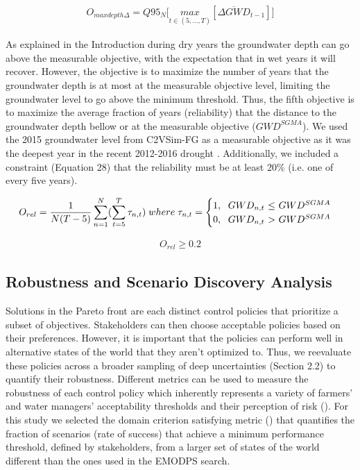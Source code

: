 \documentclass[a4paper,fleqn]{cas-sc}
\begin{document}
\begin{align}
O_{maxdepth\Delta} = Q95_{N} \bigg[\underset{t\in(5,...,T)}{max}[\overline{\Delta GWD}_{t-1}]\bigg]
\end{align}

As explained in the Introduction during dry years the groundwater depth can go above the measurable objective, with the expectation that in wet years it will recover. However, the objective is to maximize the number of years that the groundwater depth is at most at the measurable objective level, limiting the groundwater level to go above the minimum threshold. Thus, the fifth objective is to maximize the average fraction of years (reliability) that the distance to the groundwater depth bellow or at the measurable objective ($GWD^{SGMA}$). We used the 2015 groundwater level from C2VSim-FG as a measurable objective as it was the deepest year in the recent 2012-2016 drought \citep{lund_lessons_2018}. Additionally, we included a constraint (Equation 28) that the reliability must be at least 20\% (i.e. one of every five years). 

\begin{align}
O_{rel} = \frac{1}{N(T-5)}\sum_{n=1}^N(\sum_{t=5}^T \tau_{n,t})\; where\; \tau_{n,t} = \begin{cases}
      1, \text{\; $GWD_{n,t}$  $\leq$ $GWD^{SGMA}$}\\
      0, \text{\; $GWD_{n,t}$ $>$ $GWD^{SGMA}$}\\
\end{cases}      
\end{align}


\begin{align}
O_{rel} \geq 0.2
\end{align}

\subsection{Robustness and Scenario Discovery Analysis}

Solutions in the Pareto front are each distinct control policies that prioritize a subset of objectives. Stakeholders can then choose acceptable policies based on their preferences. However, it is important that the policies can perform well in alternative states of the world that they aren’t optimized to. Thus, we reevaluate these policies across a broader sampling of deep uncertainties (Section 2.2) to quantify their robustness. Different metrics can be used to measure the robustness of each control policy which inherently represents a variety of farmers’ and water managers’ acceptability thresholds and their perception of risk (\cite{mcphail_robustness_2018}). For this study we selected the domain criterion satisfying metric  (\cite{schneller_decision_1983}) that quantifies the fraction of scenarios (rate of success) that achieve a minimum performance threshold, defined by stakeholders, from a larger set of states of the world different than the ones used in the EMODPS search. 
\end{document}
